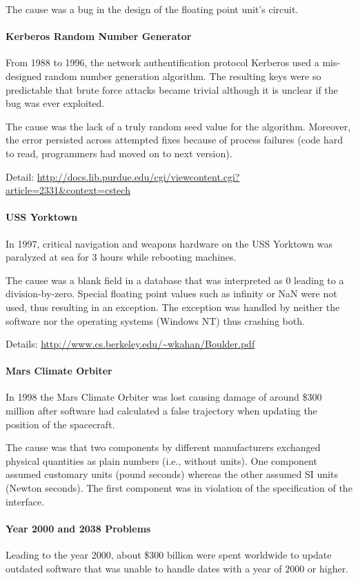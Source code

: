 The cause was a bug in the design of the floating point unit's circuit.

\paragraph{Kerberos Random Number Generator}
From 1988 to 1996, the network authentification protocol Kerberos used a mis-designed random number generation algorithm.
The resulting keys were so predictable that brute force attacks became trivial although it is unclear if the bug was ever exploited.

The cause was the lack of a truly random seed value for the algorithm.
Moreover, the error persisted across attempted fixes because of process failures (code hard to read, programmers had moved on to next version).

Detail: \url{http://docs.lib.purdue.edu/cgi/viewcontent.cgi?article=2331&context=cstech}

\paragraph{USS Yorktown}
In 1997, critical navigation and weapons hardware on the USS Yorktown was paralyzed at sea for $3$ hours while rebooting machines.

The cause was a blank field in a database that was interpreted as $0$ leading to a division-by-zero.
Special floating point values such as infinity or NaN were not used, thus resulting in an exception.
The exception was handled by neither the software nor the operating systems (Windows NT) thus crashing both.

Details: \url{http://www.cs.berkeley.edu/~wkahan/Boulder.pdf}

\paragraph{Mars Climate Orbiter}
In 1998 the Mars Climate Orbiter was lost causing damage of around \$$300$ million after software had calculated a false trajectory when updating the position of the spacecraft.

The cause was that two components by different manufacturers exchanged physical quantities as plain numbers (i.e., without units).
One component assumed customary units (pound seconds) whereas the other assumed SI units (Newton seconds).
The first component was in violation of the specification of the interface.

\paragraph{Year 2000 and 2038 Problems}
Leading to the year 2000, about \$$300$ billion were spent worldwide to update outdated software that was unable to handle dates with a year of $2000$ or higher.


